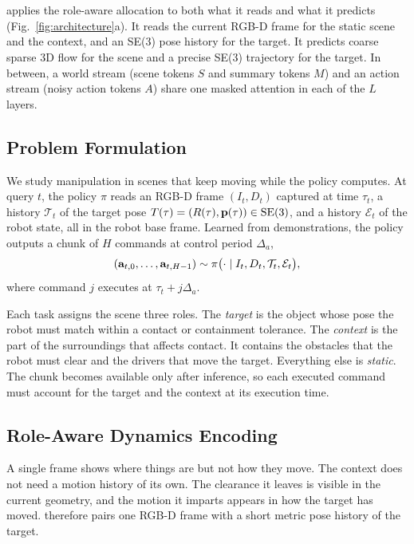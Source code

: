 \section{\ours}
\label{sec:method}

\ours applies the role-aware allocation to both what it reads and what it predicts
(Fig.~\ref{fig:architecture}a). It reads the current RGB-D frame for the static scene
and the context, and an SE(3) pose history for the target. It predicts coarse sparse 3D
flow for the scene and a precise SE(3) trajectory for the target. In between, a world
stream (scene tokens $S$ and summary tokens $M$) and an action stream (noisy action
tokens $A$) share one masked attention in each of the $L$ layers.

\subsection{Problem Formulation}
\label{sec:formulation}

We study manipulation in scenes that keep moving while the policy computes. At query
$t$, the policy $\pi$ reads an RGB-D frame $(I_t,D_t)$ captured at time $\tau_t$, a
history $\mathcal T_t$ of the target pose $T(\tau)=(R(\tau),\mathbf{p}(\tau))\in\mathrm{SE}(3)$,
and a history $\mathcal E_t$ of the robot state, all in the robot base frame. Learned
from demonstrations, the policy outputs a chunk of $H$ commands at control period
$\Delta_a$,
\begin{equation}
(\mathbf{a}_{t,0},\ldots,\mathbf{a}_{t,H-1})\sim\pi\big(\cdot\mid I_t,D_t,\mathcal T_t,\mathcal E_t\big),
\label{eq:policy}
\end{equation}
where command $j$ executes at $\tau_t+j\Delta_a$.

Each task assigns the scene three roles. The \emph{target} is the object whose pose the
robot must match within a contact or containment tolerance. The \emph{context} is the
part of the surroundings that affects contact. It contains the obstacles that the robot
must clear and the drivers that move the target. Everything else is \emph{static}. The
chunk becomes available only after inference, so each executed command must account for
the target and the context at its execution time.

\subsection{Role-Aware Dynamics Encoding}
\label{sec:inputs}

A single frame shows where things are but not how they move. The context does not need
a motion history of its own. The clearance it leaves is visible in the current geometry,
and the motion it imparts appears in how the target has moved. \ours therefore pairs one
RGB-D frame with a short metric pose history of the target.

